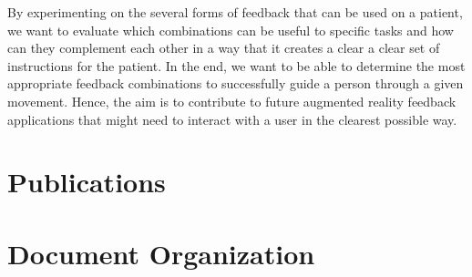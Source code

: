 By experimenting on the several forms of feedback that can be used on a patient, we want to evaluate which 
combinations can be useful to specific tasks and how can they complement each other 
in a way that it creates a clear a clear set of instructions for the patient. 
In the end, we want to be able to determine the most appropriate feedback combinations to successfully guide a person through a given movement.
Hence, the aim is to contribute to future augmented reality feedback applications that might need to interact with a user in the clearest possible way.

 

\section{Publications}


\section{Document Organization}
